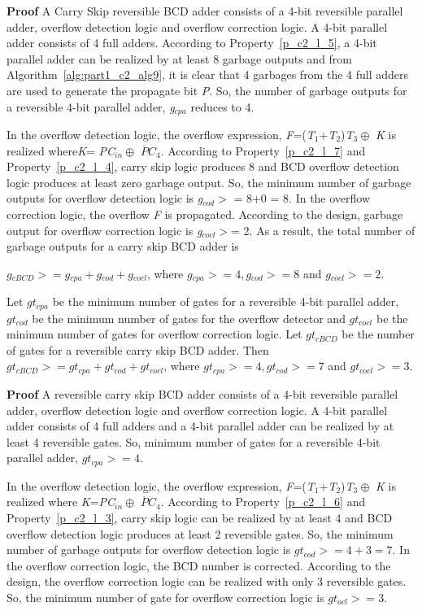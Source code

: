 \noindent\textbf{Proof}
	A Carry Skip reversible BCD adder consists of a {4}-bit reversible parallel adder, overflow detection logic and overflow correction logic. A {4}-bit parallel adder consists of 4 full adders. According to Property~\ref{p_c2_l_5}, a {4}-bit parallel adder can be realized by at least 8 garbage outputs and from Algorithm~\ref{alg:part1_c2_alg9}, it is clear that 4 garbages from the 4 full adders are used to generate the propagate bit {\it P}. So, the number of garbage outputs for a reversible {4}-bit parallel adder, {\it g}${}_{cpa}$ reduces to 4.

In the overflow detection logic, the overflow expression, {\it F}=({\it T}${}_{1}$+{\it T}${}_{2}$){\it T}${}_{3} \oplus$ {\it K} is realized where{\it K}= {\it PC}${}_{in}\oplus$ {\it $\overline{P}C$}${}_{4}$. According to Property~\ref{p_c2_l_7} and Property~\ref{p_c2_l_4}, carry skip logic produces 8 and BCD overflow detection logic produces at least zero garbage output. So, the minimum number of garbage outputs for overflow detection logic is {\it g}${}_{cod}$${>}$ = 8+0 = 8. In the overflow correction logic, the overflow {\it F }is propagated. According to the design, garbage output for overflow correction logic is {\it g}${}_{cocl}$${>}$= 2. As a result, the total number of garbage outputs for a carry skip BCD adder is

$g{}_{cBCD}{>}= g{}_{cpa} + g{}_{cod} + g{}_{cocl}$, where $g{}_{cpa}{>}= 4, g{}_{cod}{>} = 8$ and $g{}_{cocl}{>}= 2$.

\begin{property}\textnormal{
	Let $gt{}_{cpa}$ be the minimum number of gates for a reversible 4-bit parallel adder, $gt{}_{cod}$ be the minimum number of gates for the overflow detector and $gt{}_{cocl}$ be the minimum number of gates for overflow correction logic. Let $gt{}_{cBCD}$ be the number of gates for a reversible carry skip BCD adder. Then	
	$gt{}_{cBCD}{>} = gt{}_{cpa} + gt{}_{cod} + gt{}_{cocl}$, where $gt{}_{cpa}{>}= 4, gt{}_{cod}{>}= 7$ and $gt{}_{cocl}{>}= 3.$}
\end{property}

\noindent\textbf{Proof}
	A reversible carry skip BCD adder consists of a {4}-bit reversible parallel adder, overflow detection logic and overflow correction logic. A {4}-bit parallel adder consists of 4 full adders and a {4}-bit parallel adder can be realized by at least 4 reversible gates. So, minimum number of gates for a reversible {4}-bit parallel adder, $gt{}_{cpa}{>}= 4$.

In the overflow detection logic, the overflow expression, {\it F}=({\it T}${}_{1}$+{\it T}${}_{2}$){\it T}${}_{3} \oplus$ {\it K} is realized where {\it K}={\it PC}${}_{in}\oplus$ {\it $\overline{P}C$}${}_{4}$. According to Property~\ref{p_c2_l_6} and Property~\ref{p_c2_l_3}, carry skip logic can be realized by at least 4 and BCD overflow detection logic produces at least 2 reversible gates. So, the minimum number of garbage outputs for overflow detection logic is $gt{}_{cod}{>} = 4+3=7$. In the overflow correction logic, the BCD number is corrected. According to the design, the overflow correction logic can be realized with only 3 reversible gates. So, the minimum number of gate for overflow correction logic is $gt{}_{ocl}{>} = 3$.

